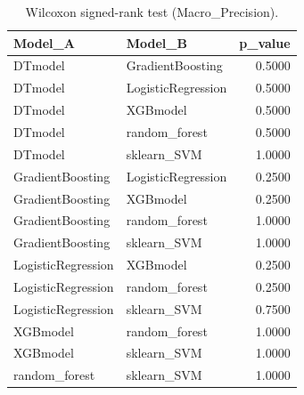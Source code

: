 \begin{table}[t]
\centering
\begin{tabular}{llr}
\toprule
Model_A & Model_B & p_value \\
\midrule
DTmodel & GradientBoosting & 0.5000 \\
DTmodel & LogisticRegression & 0.5000 \\
DTmodel & XGBmodel & 0.5000 \\
DTmodel & random_forest & 0.5000 \\
DTmodel & sklearn_SVM & 1.0000 \\
GradientBoosting & LogisticRegression & 0.2500 \\
GradientBoosting & XGBmodel & 0.2500 \\
GradientBoosting & random_forest & 1.0000 \\
GradientBoosting & sklearn_SVM & 1.0000 \\
LogisticRegression & XGBmodel & 0.2500 \\
LogisticRegression & random_forest & 0.2500 \\
LogisticRegression & sklearn_SVM & 0.7500 \\
XGBmodel & random_forest & 1.0000 \\
XGBmodel & sklearn_SVM & 1.0000 \\
random_forest & sklearn_SVM & 1.0000 \\
\bottomrule
\end{tabular}
\caption{Wilcoxon signed-rank test (Macro_Precision).}
\label{tab:wilcoxon_Macro_Precision}
\end{table}